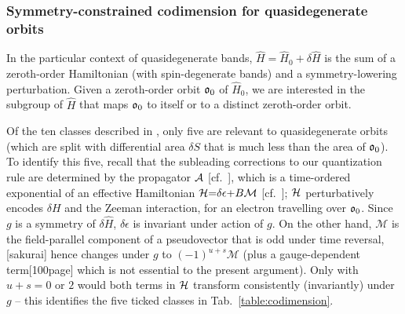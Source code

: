 \documentclass[aps, prb, showpacs, twocolumn, notitlepage, superscriptaddress]{revtex4-1}
\begin{document}
\subsubsection{Symmetry-constrained codimension for quasidegenerate orbits}\label{sec:codimquasideg}


In the particular context of quasidegenerate bands, $\hat{H}{=}\hat{H}_0{+}\delta \hat{H}$ is the sum of a zeroth-order Hamiltonian (with spin-degenerate bands) and a symmetry-lowering perturbation.  Given a zeroth-order orbit $\mathfrak{o}_0$ of $\hat{H}_0$, we  are interested in the subgroup of $\hat{H}$ that  maps $\mathfrak{o}_0$ to itself or to a distinct zeroth-order orbit. 

Of the ten classes described in , only five   are relevant to quasidegenerate orbits (which are split with differential area  $\delta S$ that is much less than the area of $\mathfrak{o}_0$).
To identify this five, recall that the subleading corrections to our quantization rule are determined by the propagator ${\cal A}$ [cf.\ ], which is a time-ordered exponential of an effective Hamiltonian $\mathcal{H}{=}\delta\epsilon{+}B \mathcal{M}$ [cf.\ ]; $\mathcal{H}$ perturbatively encodes $\delta H$ and the Zeeman interaction, for an electron travelling over  $\mathfrak{o}_0$. Since $g$ is  a symmetry of  $\delta \hat{H}$, $\delta\epsilon$ is invariant under action of $g$. On the other hand, $\mathcal{M}$ is the field-parallel component of a pseudovector that is odd under time reversal,[sakurai] hence changes under $g$ to  $(-1)^{u+s}\mathcal{M}$  (plus a gauge-dependent term[100page] which is not essential to the present argument). Only with $u{+}s{=}0$ or $2$ would both terms in $\mathcal{H}$ transform consistently (invariantly) under $g$ -- this identifies the five ticked classes in Tab.\ \ref{table:codimension}.



\end{document}
